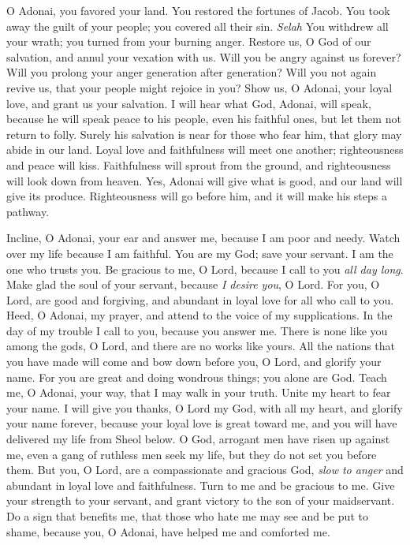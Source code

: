 \begin{biblechapter} %
 O Adonai, you favored your land. 
You restored the fortunes of Jacob.
\verse You took away the guilt of your people; 
you covered all their sin. \textit{Selah}
\verse You withdrew all your wrath; 
you turned from your burning anger.
\verse Restore us, O God of our salvation, 
and annul your vexation with us.
\verse Will you be angry against us forever? 
Will you prolong your anger generation after generation?
\verse Will you not again revive us, 
that your people might rejoice in you?
\verse Show us, O Adonai, your loyal love, 
and grant us your salvation.
\verse I will hear what God, Adonai, will speak, 
because he will speak peace 
to his people, even his faithful ones, 
but let them not return to folly.
\verse Surely his salvation is near for those who fear him, 
that glory may abide in our land.
\verse Loyal love and faithfulness will meet one another; 
righteousness and peace will kiss.
\verse Faithfulness will sprout from the ground, 
and righteousness will look down from heaven.
\verse Yes, Adonai will give what is good, 
and our land will give its produce.
\verse Righteousness will go before him, 
and it will make his steps a pathway.
\end{biblechapter}

\begin{biblechapter} %
 Incline, O Adonai, your ear and answer me, 
because I am poor and needy.
\verse Watch over my life because I am faithful. 
You are my God; save your servant. 
I am the one who trusts you.
\verse Be gracious to me, O Lord, 
because I call to you \textit{all day long}.
\verse Make glad the soul of your servant, 
because \textit{I desire you}, O Lord.
\verse For you, O Lord, are good and forgiving, 
and abundant in loyal love for all who call to you.
\verse Heed, O Adonai, my prayer, 
and attend to the voice of my supplications.
\verse In the day of my trouble I call to you, 
because you answer me.
\verse There is none like you among the gods, O Lord, 
and there are no works like yours.
\verse All the nations that you have made will come 
and bow down before you, O Lord, 
and glorify your name.
\verse For you are great and doing wondrous things; 
you alone are God.
\verse Teach me, O Adonai, your way, 
that I may walk in your truth. 
Unite my heart to fear your name.
\verse I will give you thanks, O Lord my God, with all my heart, 
and glorify your name forever,
\verse because your loyal love is great toward me, 
and you will have delivered my life from Sheol below.
\verse O God, arrogant men have risen up against me, 
even a gang of ruthless men seek my life, 
but they do not set you before them.
\verse But you, O Lord, are a compassionate and gracious God, 
\textit{slow to anger} and abundant in loyal love and faithfulness.
\verse Turn to me and be gracious to me. 
Give your strength to your servant, 
and grant victory to the son of your maidservant.
\verse Do a sign that benefits me, 
that those who hate me may see and be put to shame, 
because you, O Adonai, have helped me and comforted me.
\end{biblechapter}

